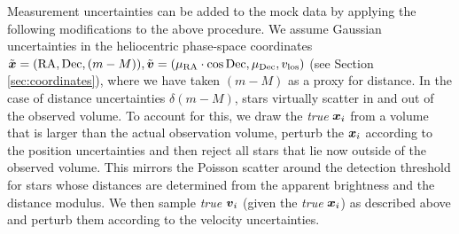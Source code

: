 Measurement uncertainties can be added to the mock data by applying the following modifications to the above procedure. We assume Gaussian uncertainties in the heliocentric phase-space coordinates $\tilde{\boldsymbol{x}} = (\text{RA},\text{Dec},(m-M)), \tilde{\boldsymbol{v}} = (\mu_\text{RA} \cdot \cos \text{Dec} ,\mu_\text{Dec},v_\text{los})$ (see Section \ref{sec:coordinates}), where we have taken $(m-M)$ as a proxy for distance. In the case of distance uncertainties $\delta(m-M)$, stars virtually scatter in and out of the observed volume. To account for this, we draw the \emph{true} $\boldsymbol{x}_i$ from a volume that is larger than the actual observation volume, perturb the $\boldsymbol{x}_i$ according to the position uncertainties and then reject all stars that lie now outside of the observed volume. This mirrors the Poisson scatter around the detection threshold for stars whose distances are determined from the apparent brightness and the distance modulus. We then sample \emph{true} $\boldsymbol{v}_i$ (given the \emph{true} $\boldsymbol{x}_i$) as described above and perturb them according to the velocity uncertainties.

